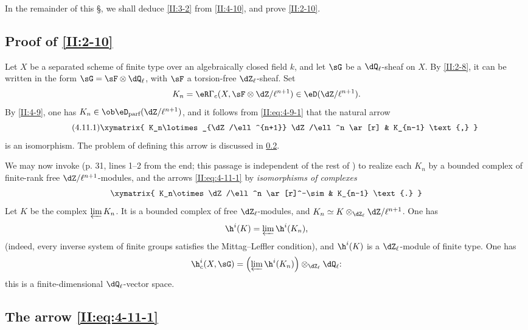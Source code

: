 In the remainder of this \S, we shall deduce \ref{II:3-2} from
\ref{II:4-10}, and prove \ref{II:2-10}.






\subsection{Proof of \texorpdfstring{\ref{II:2-10}}{2.10}}\label{II:4-11}

Let $X$ be a separated scheme of finite type over an algebraically closed
field $k$, and let $\sG$ be a $\dQ_\ell$-sheaf on $X$. By \ref{II:2-8}, it
can be written in the form $\sG=\sF\otimes\dQ_\ell$, with $\sF$ a
torsion-free $\dZ_\ell$-sheaf. Set
\[
  K_n = \eR \Gamma_c(X,\sF\otimes\dZ/\ell^{n+1})\in\eD(\dZ/\ell^{n+1}) \text{.}
\]
By \ref{II:4-9}, one has
$K_n\in\ob\eD_\text{parf}(\dZ/\ell^{n+1})$, and it follows from
\eqref{II:eq:4-9-1} that the natural arrow
\begin{equation*}\tag{4.11.1}\label{II:eq:4-11-1}
\xymatrix{
  K_n\lotimes_{\dZ/\ell^{n+1}} \dZ/\ell^n \ar[r] & K_{n-1} \text{,}
}
\end{equation*}
is an isomorphism. The problem of defining this arrow is discussed in
\ref{II:4-12}.

We may now invoke  (p. 31, lines 1--2 from the end; this
passage is independent of the rest of ) to realize each $K_n$ by
a bounded complex of finite-rank free $\dZ/\ell^{n+1}$-modules, and the
arrows \eqref{II:eq:4-11-1} by \emph{isomorphisms of complexes}
\[\xymatrix{
  K_n\otimes \dZ/\ell^n \ar[r]^-\sim
    & K_{n-1} \text{.}
}\]
Let $K$ be the complex $\varprojlim K_n$. It is a bounded complex of free
$\dZ_\ell$-modules, and
$K_n\simeq K\otimes_{\dZ_\ell}\dZ/\ell^{n+1}$. One has
\[
  \h^i(K) = \varprojlim \h^i(K_n) \text{,}
\]
(indeed, every inverse system of finite groups satisfies the Mittag--Leffler
condition), and $\h^i(K)$ is a $\dZ_\ell$-module of finite type. One has
\[
  \h_c^i(X,\sG) = \left(\varprojlim \h^i(K_n) \right)\otimes_{\dZ_\ell} \dQ_\ell \text{:}
\]
this is a finite-dimensional $\dQ_\ell$-vector space.






\subsection{The arrow \texorpdfstring{\eqref{II:eq:4-11-1}}{(4.11.1)}}\label{II:4-12}


